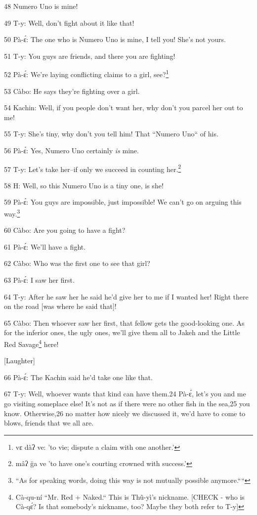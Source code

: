 48             Numero Uno is mine!

49 T-y: Well, don't fight about it like that!

50 Pà-ɛ́: The one who is Numero Uno is mine, I tell you! She's not yours.

51 T-y: You guys are friends, and there you are fighting!

52 Pà-ɛ́: We're laying conflicting claims to a girl, see?\footnote{vɛ dàʔ ve: 'to vie; dispute a claim with one another.'}

53 Càbo: He says they're fighting over a girl.

54 Kachin: Well, if you people don't want her, why don't you parcel her out to
me!

55 T-y: She's tiny, why don't you tell him! That ``Numero Uno``
of his.

56 Pà-ɛ́: Yes, Numero Uno certainly\textit{ is} mine.

57 T-y: Let's take her--if only we succeed in counting her.\footnote{mâʔ g̈a ve 'to have one's courting crowned with success.'}

58 H: Well, so this Numero Uno is a tiny one, is she!

59 Pà-ɛ́: You guys are impossible, just impossible! We can't go on arguing this
way.\footnote{``As for speaking words, doing this way is not mutually possible anymore.````}

60 Càbo: Are you going to have a fight?

61 Pà-ɛ́: We'll have a fight.

62 Càbo: Who was the first one to see that girl?

63 Pà-ɛ́: I saw her first.

64 T-y: After he saw her he said he'd give her to me if I wanted her! Right there
on the road [was where he said that]!

65 Càbo: Then whoever saw her first, that fellow gets the good-looking one. As
for the inferior ones, the ugly ones, we'll give them all to Jakeh and the Little
Red Savage\footnote{Cà-qu-ní ``Mr. Red + Naked.`` This is Thû-yì's nickname. [CHECK - who is Cà-qɛ́? Is that somebody's nickname, too? Maybe they both refer to T-y]} here!

\begin{center}
[Laughter]
\end{center}

\leftskip=0pt
66 Pà-ɛ́: The Kachin said he'd take one like that.

67 T-y: Well, whoever wants that kind can have them.{\small{}24} Pà-ɛ́, let's
you and me go visiting someplace else! It's not as if there were no other fish
in the sea,{\small{}25} you know. Otherwise,{\small{}26} no matter how nicely we
discussed it, we'd have to come to blows, friends that we all are.

